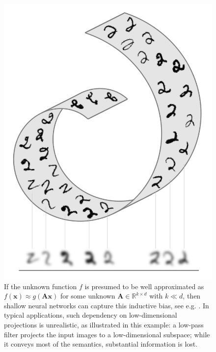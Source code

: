\begin{figure}[htbp]
    \centering
\includegraphics[width=0.6\linewidth]{figures/mnist.png}
    \caption{%
    If the unknown function $f$ %
    is presumed to be well approximated as $f(\mathbf{x}) \approx g(\mathbf{A}\mathbf{x})$ for some unknown $\mathbf{A} \in \mathbb{R}^{k \times d}$ with $k \ll d$, then shallow neural networks can capture this inductive bias, see e.g.  \cite{bach2017breaking}. In typical applications, such dependency on low-dimensional projections is unrealistic, as illustrated in this example: a low-pass filter projects the input images to a low-dimensional subspace; while it conveys most of the semantics, substantial information is lost.%
    }
    \label{fig:curseofdim2}
\end{figure}










